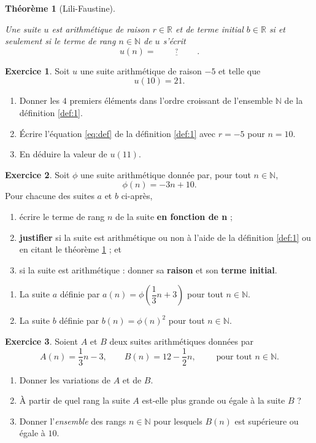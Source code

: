 \documentclass[12pt]{paper}
\theoremstyle{plain}
\newtheorem{theorem}{Th\'eor\`eme}
\theoremstyle{definition}
\newtheorem{ex}{Exercice}
\newcommand{\R}{\mathbb{R}}
\newcommand{\N}{\mathbb{N}}
\begin{document}
\begin{theorem}[Lili-Faustine]\label{thm:1}
	
	Une suite $u$ est arithmétique de raison $r\in\R$ et de terme initial $b\in\R$ si et seulement si le terme de rang $n\in\N$ de $u$ s'écrit
		\[ u(n) = \stackrel{?}{\underline{\hspace{2cm}}}.\]
		
\end{theorem}

\begin{ex}
	Soit $u$ une suite arithmétique de raison $-5$ et telle que
		\[u(10) = 21. \]
	\begin{enumerate}
		\item Donner les $4$ premiers éléments dans l'ordre croissant de l'ensemble $\N$ de la définition \ref{def:1}.
		\item Écrire l'équation \eqref{eq:def} de la définition \ref{def:1} avec $r=-5$ pour $n=10$.
		\item En déduire la valeur de $u(11)$.
	\end{enumerate}
\end{ex}


\begin{ex}
	Soit $\phi$ une suite arithmétique donnée par, pour tout $n\in\N$,
		\[ \phi(n) = -3n + 10. \]
	Pour chacune des suites $a$ et $b$ ci-après, 
		\begin{enumerate}[leftmargin=2cm, label=\roman*)]
			\item écrire le terme de rang $n$ de la suite \textbf{en fonction de n} ; 
			\item  \textbf{justifier} si la suite est arithmétique ou non à l'aide de la définition \ref{def:1} ou en citant le théorème \ref{thm:1} ; et
			\item si la suite est arithmétique : donner sa \textbf{raison} et son \textbf{terme initial}.
		\end{enumerate}
		\vspace{5pt}
		\begin{enumerate}[leftmargin=1cm]
			\item La suite $a$ définie par $a(n) = \phi\left(\dfrac13n+3\right)$ pour tout $n\in\N$.
			\item La suite $b$ définie par $b(n) = \phi(n)^2$ pour tout $n\in\N$.
		\end{enumerate}
\end{ex}

\begin{ex}
	Soient $A$ et $B$ deux suites arithmétiques données par
		\[ A(n) = \dfrac13n - 3, \qquad B(n) = 12 - \dfrac12n, \qquad \text{ pour tout } n \in \N.\]
	\begin{enumerate}
		\item Donner les variations de $A$ et de $B$.
		\item À partir de quel rang la suite $A$ est-elle plus grande ou égale à la suite $B$ ?
		\item Donner l'\emph{ensemble} des rangs $n\in\N$ pour lesquels $B(n)$ est  supérieure ou égale à $10$.
	\end{enumerate}
\end{ex}
\end{document}

